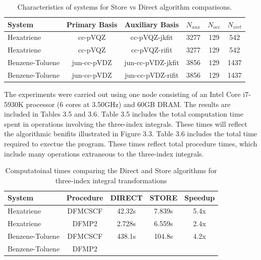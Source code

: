\begingroup
\begin{table}[H]
\centering
\renewcommand{\baselinestretch}{1}
\caption{Characteristics of systems for Store vs Direct algorithm comparisons.}
\begin{tabular}{l ccccc}
\multicolumn{1}{l}{\textbf{System}} &
\multicolumn{1}{c}{\textbf{Primary Basis}} &
\multicolumn{1}{c}{\textbf{Auxiliary Basis}} &
\multicolumn{1}{c}{\textbf{$N_{aux}$}} &
\multicolumn{1}{c}{\textbf{$N_{occ}$}} &
\multicolumn{1}{c}{\textbf{$N_{virt}$}} \\
\hline
Hexatriene        & cc-pVQZ     & cc-pVQZ-jkfit & 3277      & 129       & 542        \\ 
Hexatriene        & cc-pVQZ     & cc-pVQZ-rifit & 3277      & 129       & 542        \\ 
Benzene-Toluene   & jun-cc-pVDZ & jun-cc-pVDZ-jkfit & 3856  & 129       & 1437       \\ 
Benzene-Toluene   & jun-cc-pVDZ & jun-cc-pVDZ-rifit & 3856  & 129       & 1437       \\ 
\end{tabular}
\end{table}
\endgroup

The experiments were carried out using one node consisting of an Intel Core i7-5930K processor
(6 cores at 3.50GHz) and 60GB DRAM. The results are included in Tables 3.5 and 3.6. Table 3.5 includes
the total computation time spent in operations involving the three-index integrals. These times will
reflect the algorithmic benifits illustrated in Figure 3.3. Table 3.6 includes the total time required
to exectue the program. These times reflect total procedure times, which include many operations extraneous
to the three-index integrals.


\begingroup
\begin{table}[H]
\centering
\renewcommand{\baselinestretch}{1}
\caption{Computatoinal times comparing the Direct and Store algorithms for three-index integral transformations}
\begin{tabular}{l cccc}
\multicolumn{1}{l}{\textbf{System}} &
\multicolumn{1}{c}{\textbf{Procedure}} &
\multicolumn{1}{c}{\textbf{DIRECT}} &
\multicolumn{1}{c}{\textbf{STORE}} &
\multicolumn{1}{c}{\textbf{Speedup}} \\ 
\hline
Hexatriene        & DFMCSCF & 42.32s  & 7.839s  &  5.4x  \\ 
Hexatriene        & DFMP2   & 2.728s  & 6.559s  &  2.4x  \\ 
Benzene-Toluene   & DFMCSCF & 438.1s  & 104.8s  &  4.2x  \\ 
Benzene-Toluene   & DFMP2   &      &   &    \\ 
\end{tabular}
\end{table}
\endgroup


